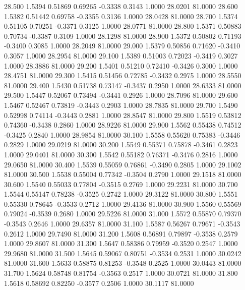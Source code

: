   28.500   1.5394   0.51869   0.69265  -0.3338   0.3143   1.0000  28.0201  81.0000
  28.600   1.5382   0.51442   0.69758  -0.3355   0.3136   1.0000  28.0428  81.0000
  28.700   1.5374   0.51105   0.70251  -0.3371   0.3125   1.0000  28.0771  81.0000
  28.800   1.5371   0.50883   0.70734  -0.3387   0.3109   1.0000  28.1298  81.0000
  28.900   1.5372   0.50802   0.71193  -0.3400   0.3085   1.0000  28.2049  81.0000
  29.000   1.5379   0.50856   0.71620  -0.3410   0.3057   1.0000  28.2954  81.0000
  29.100   1.5389   0.51003   0.72023  -0.3419   0.3027   1.0000  28.3886  81.0000
  29.200   1.5401   0.51210   0.72410  -0.3426   0.3000   1.0000  28.4751  81.0000
  29.300   1.5415   0.51456   0.72785  -0.3432   0.2975   1.0000  28.5550  81.0000
  29.400   1.5430   0.51738   0.73147  -0.3437   0.2950   1.0000  28.6333  81.0000
  29.500   1.5447   0.52067   0.73494  -0.3441   0.2926   1.0000  28.7096  81.0000
  29.600   1.5467   0.52467   0.73819  -0.3443   0.2903   1.0000  28.7835  81.0000
  29.700   1.5490   0.52998   0.74114  -0.3443   0.2881   1.0000  28.8547  81.0000
  29.800   1.5519   0.53812   0.74360  -0.3438   0.2860   1.0000  28.9226  81.0000
  29.900   1.5562   0.55438   0.74512  -0.3425   0.2840   1.0000  28.9854  81.0000
  30.100   1.5558   0.55620   0.75383  -0.3446   0.2829   1.0000  29.0219  81.0000
  30.200   1.5549   0.55371   0.75878  -0.3461   0.2823   1.0000  29.0401  81.0000
  30.300   1.5542   0.55182   0.76371  -0.3476   0.2816   1.0000  29.0650  81.0000
  30.400   1.5539   0.55059   0.76861  -0.3490   0.2805   1.0000  29.1002  81.0000
  30.500   1.5538   0.55004   0.77342  -0.3504   0.2790   1.0000  29.1518  81.0000
  30.600   1.5540   0.55033   0.77804  -0.3515   0.2769   1.0000  29.2231  81.0000
  30.700   1.5544   0.55147   0.78238  -0.3525   0.2742   1.0000  29.3122  81.0000
  30.800   1.5551   0.55330   0.78645  -0.3533   0.2712   1.0000  29.4136  81.0000
  30.900   1.5560   0.55569   0.79024  -0.3539   0.2680   1.0000  29.5226  81.0000
  31.000   1.5572   0.55870   0.79370  -0.3543   0.2646   1.0000  29.6357  81.0000
  31.100   1.5587   0.56267   0.79671  -0.3543   0.2612   1.0000  29.7490  81.0000
  31.200   1.5608   0.56891   0.79897  -0.3538   0.2579   1.0000  29.8607  81.0000
  31.300   1.5647   0.58386   0.79959  -0.3520   0.2547   1.0000  29.9680  81.0000
  31.500   1.5645   0.59067   0.80751  -0.3534   0.2531   1.0000  30.0242  81.0000
  31.600   1.5633   0.58875   0.81253  -0.3548   0.2525   1.0000  30.0443  81.0000
  31.700   1.5624   0.58748   0.81754  -0.3563   0.2517   1.0000  30.0721  81.0000
  31.800   1.5618   0.58692   0.82250  -0.3577   0.2506   1.0000  30.1117  81.0000
